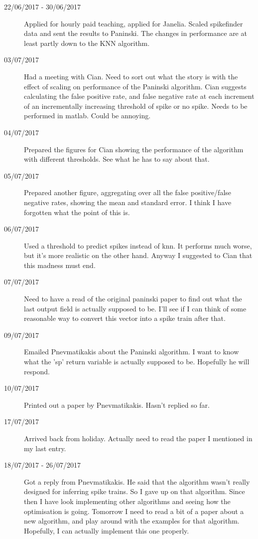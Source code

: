 \documentclass[a4paper,12pt]{article}
\theoremstyle{definition}
\begin{document}
\begin{description}
	\item[22/06/2017 - 30/06/2017] Applied for hourly paid teaching, applied for Janelia. Scaled spikefinder data and sent the results to Paninski. The changes in performance are at least partly down to the KNN algorithm.

	\item[03/07/2017] Had a meeting with Cian. Need to sort out what the story is with the effect of scaling on performance of the Paninski algorithm. Cian suggests calculating the false positive rate, and false negative rate at each increment of an incrementally increasing threshold of spike or no spike. Needs to be performed in matlab. Could be annoying.

	\item[04/07/2017] Prepared the figures for Cian showing the performance of the algorithm with different thresholds. See what he has to say about that.

	\item[05/07/2017] Prepared another figure, aggregating over all the false positive/false negative rates, showing the mean and standard error. I think I have forgotten what the point of this is.

	\item[06/07/2017] Used a threshold to predict spikes instead of knn. It performs much worse, but it's more realistic on the other hand. Anyway I suggested to Cian that this madness must end.

	\item[07/07/2017] Need to have a read of the original paninski paper to find out what the last output field is actually supposed to be. I'll see if I can think of some reasonable way to convert this vector into a spike train after that.

	\item[09/07/2017] Emailed Pnevmatikakis about the Paninski algorithm. I want to know what the 'sp' return variable is actually supposed to be. Hopefully he will respond.

	\item[10/07/2017] Printed out a paper by Pnevmatikakis. Hasn't replied so far.

	\item[17/07/2017] Arrived back from holiday. Actually need to read the paper I mentioned in my last entry.

	\item[18/07/2017 - 26/07/2017] Got a reply from Pnevmatikakis. He said that the algorithm wasn't really designed for inferring spike trains. So I gave up on that algorithm. Since then I have look implementing other algorithms and seeing how the optimisation is going. Tomorrow I need to read a bit of a paper about a new algorithm, and play around with the examples for that algorithm. Hopefully, I can actually implement this one properly.


\end{description}
\end{document}
